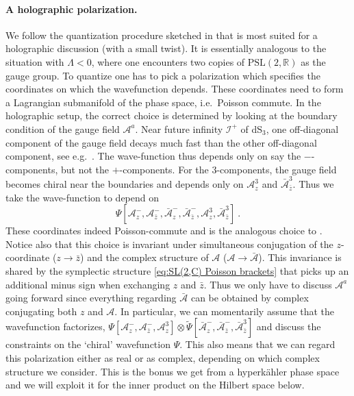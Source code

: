 \documentclass[12pt,a4paper]{article}
\newcommand{\be}{\begin{equation}}
\newcommand{\ee}{\end{equation}}
\newcommand\PSL{\text{PSL}}
\newcommand\RR{\mathbb{R}}
\begin{document}
\paragraph{A holographic polarization.} We follow the quantization procedure sketched in \cite{Verlinde:2024zrh} that is most suited for a holographic discussion (with a small twist). It is essentially analogous to the situation with $\Lambda<0$, where one encounters two copies of $\PSL(2,\RR)$ as the gauge group. To quantize one has to pick a polarization which specifies the coordinates on which the wavefunction depends. 
These coordinates need to form a Lagrangian submanifold of the phase space, i.e.\ Poisson commute. 
In the holographic setup, the correct choice is determined by looking at the boundary condition of the gauge field $\mathcal{A}^a$. Near future infinity $\mathcal{I}^+$ of dS$_3$, one off-diagonal component of the gauge field decays much fast than the other off-diagonal component, see e.g.\ \cite{Cotler:2024xzz}. The wave-function thus depends only on say the $-$-components, but not the $+$-components. For the $3$-components, the gauge field becomes chiral near the boundaries and depends only on $\mathcal{A}_z^3$ and $\bar{\mathcal{A}}_{\bar{z}}^3$. Thus we take the wave-function to depend on
\be 
\Psi[\mathcal{A}_z^-,\mathcal{A}_{\bar{z}}^-,\bar{\mathcal{A}}_z^-, \bar{\mathcal{A}}_{\bar{z}}^-,\mathcal{A}_z^3, \bar{\mathcal{A}}_{\bar{z}}^3]~.
\ee
These coordinates indeed Poisson-commute and is the analogous choice to \cite{Verlinde:1989ua}. Notice also that this choice is invariant under simultaneous conjugation of the $z$-coordinate ($z \to \bar{z}$) and the complex structure of $\mathcal{A}$ ($\mathcal{A} \to \bar{\mathcal{A}}$). This invariance is shared by the symplectic structure \eqref{eq:SL(2,C) Poisson brackets} that picks up an additional minus sign when exchanging $z$ and $\bar{z}$. Thus we only have to discuss $\mathcal{A}^a$ going forward since everything regarding $\bar{\mathcal{A}}$ can be obtained by complex conjugating both $z$ and $\mathcal{A}$. In particular, we can momentarily assume that the wavefunction factorizes, $\Psi[\mathcal{A}_z^-,\mathcal{A}_{\bar{z}}^-,\mathcal{A}_z^3] \otimes \widetilde{\Psi}[\bar{\mathcal{A}}_z^-, \bar{\mathcal{A}}_{\bar{z}}^-, \bar{\mathcal{A}}_{\bar{z}}^3]$ and discuss the constraints on the `chiral' wavefunction $\Psi$. 
This also means that we can regard this polarization either as real or as complex, depending on which complex structure we consider. This is the bonus we get from a hyperk\"ahler phase space and we will exploit it for the inner product on the Hilbert space below.
\end{document}
